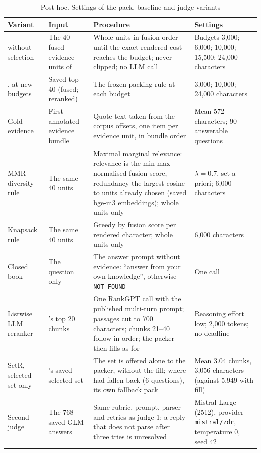 \begin{table}[tp]
\caption{Post hoc. Settings of the pack, baseline and judge variants}
\label{tab:posthoc-settings}
\centering
\scriptsize
\setlength{\tabcolsep}{3pt}
\begin{tabularx}{\textwidth}{@{}p{2.6cm}p{2.9cm}Xp{2.8cm}@{}}
\toprule
Variant & Input & Procedure & Settings \\
\midrule
\lexb{} without selection & The 40 fused evidence units of \lexb{} & Whole units in fusion order until the exact rendered cost reaches the budget; never clipped; no LLM call & Budgets 3,000; 6,000; 10,000; 15,500; 24,000 characters \\
\hybrid{}, \hr{} at new budgets & Saved top 40 (fused; reranked) & The frozen packing rule at each budget & 3,000; 10,000; 24,000 characters \\
Gold evidence & First annotated evidence bundle & Quote text taken from the corpus offsets, one item per evidence unit, in bundle order & Mean 572 characters; 90 answerable questions \\
MMR diversity rule & The same 40 units & Maximal marginal relevance: relevance is the min-max normalised fusion score, redundancy the largest cosine to units already chosen (saved bge-m3 embeddings); whole units only & $\lambda=0.7$, set a priori; 6,000 characters \\
Knapsack rule & The same 40 units & Greedy by fusion score per rendered character; whole units only & 6,000 characters \\
Closed book & The question only & The answer prompt without evidence: ``answer from your own knowledge'', otherwise \texttt{NOT\_FOUND} & One call \\
Listwise LLM reranker & \hybrid{}'s top 20 chunks & One RankGPT call with the published multi-turn prompt; passages cut to 700 characters; chunks 21--40 follow in \hybrid{} order; the packer then fills as for \hybrid{} & Reasoning effort low; 2,000 tokens; no deadline \\
SetR, selected set only & \setr{}'s saved selected set & The set is offered alone to the packer, without the \hybrid{} fill; where \setr{} had fallen back (6 questions), its own fallback pack & Mean 3.04 chunks, 3,056 characters (against 5,949 with fill) \\
Second judge & The 768 saved GLM answers & Same rubric, prompt, parser and retries as judge 1; a reply that does not parse after three tries is unresolved & Mistral Large (2512), provider \texttt{mistral/zdr}, temperature 0, seed 42 \\
\bottomrule
\end{tabularx}
\end{table}

